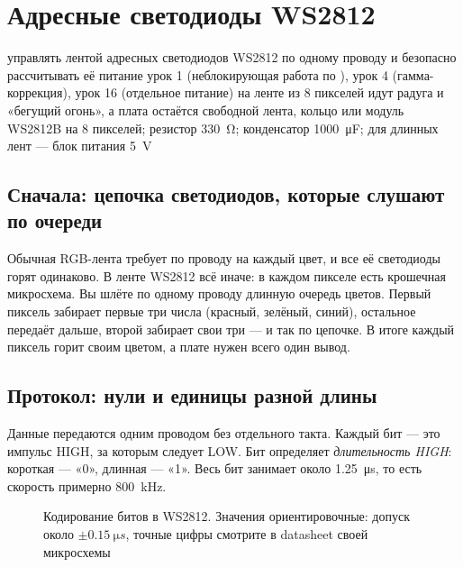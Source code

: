 \section{Адресные светодиоды WS2812}
\lessonintro
  {управлять лентой адресных светодиодов WS2812 по одному проводу и безопасно рассчитывать её питание}
  {урок 1 (неблокирующая работа по ), урок 4 (гамма-коррекция), урок 16 (отдельное питание)}
  {на ленте из 8 пикселей идут радуга и «бегущий огонь», а плата остаётся свободной}
  {лента, кольцо или модуль WS2812B на 8 пикселей; резистор \SI{330}{\ohm}; конденсатор \SI{1000}{\micro F}; для длинных лент --- блок питания \SI{5}{V}}

\subsection{Сначала: цепочка светодиодов, которые слушают по очереди}

Обычная RGB-лента требует по проводу на каждый цвет, и все её светодиоды горят одинаково. В ленте WS2812
всё иначе: в каждом пикселе есть крошечная микросхема. Вы шлёте по одному проводу длинную очередь цветов.
Первый пиксель забирает первые три числа (красный, зелёный, синий), остальное передаёт дальше, второй
забирает свои три --- и так по цепочке. В итоге каждый пиксель горит своим цветом, а плате нужен всего
один вывод.

\subsection{Протокол: нули и единицы разной длины}

Данные передаются одним проводом без отдельного такта. Каждый бит --- это импульс HIGH, за которым следует
LOW. Бит определяет \emph{длительность HIGH}: короткая --- «0», длинная --- «1». Весь бит занимает
около \SI{1.25}{\micro s}, то есть скорость примерно \SI{800}{kHz}.

\begin{figure}[H]
\centering
{}
\caption{Кодирование битов в WS2812. Значения ориентировочные: допуск около $\pm\SI{0.15}{\micro s}$,
точные цифры смотрите в datasheet своей микросхемы}
\end{figure}

